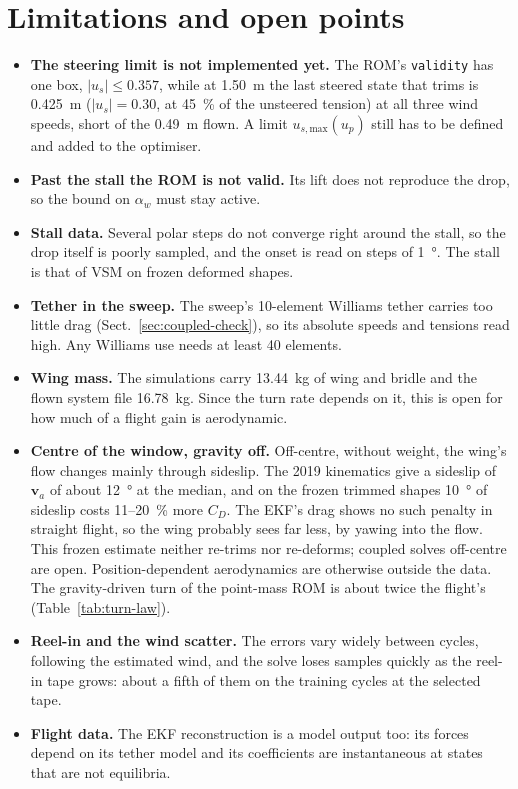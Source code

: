 \documentclass[11pt,a4paper]{article}
\newcommand{\code}[1]{\texttt{\small #1}}
\begin{document}
\section{Limitations and open points}
\label{sec:open}
\begin{itemize}
  \item \textbf{The steering limit is not implemented yet.} The ROM's \code{validity} has
        one box, $|u_s|\le0.357$, while at \SI{1.50}{\metre} the last steered state that trims
        is \SI{0.425}{\metre} ($|u_s|=0.30$, at \SI{45}{\percent} of the unsteered tension) at
        all three wind speeds, short of the \SI{0.49}{\metre} flown. A limit
        $u_{s,\mathrm{max}}(u_p)$ still has to be defined and added to the optimiser.
  \item \textbf{Past the stall the ROM is not valid.} Its lift does not reproduce the
        drop, so the bound on $\alpha_w$ must stay active.
  \item \textbf{Stall data.} Several polar steps do not converge right around the stall,
        so the drop itself is poorly sampled, and the onset is read on steps of
        \SI{1}{\degree}. The stall is that of VSM on frozen deformed shapes.
  \item \textbf{Tether in the sweep.} The sweep's 10-element Williams tether carries too little drag
        (Sect.~\ref{sec:coupled-check}), so its absolute speeds and tensions read high. Any
        Williams use needs at least 40 elements.
  \item \textbf{Wing mass.} The simulations carry \SI{13.44}{\kilogram} of wing and bridle
        and the flown system file \SI{16.78}{\kilogram}. Since the turn rate depends on it, this
        is open for how much of a flight gain is aerodynamic.
  \item \textbf{Centre of the window, gravity off.} Off-centre, without weight, the wing's flow
        changes mainly through sideslip. The 2019 kinematics give a sideslip of $\mathbf v_a$ of about
        \SI{12}{\degree} at the median, and on the frozen trimmed shapes \SI{10}{\degree} of sideslip costs
        11--\SI{20}{\percent} more $C_D$. The EKF's drag shows no such penalty in straight flight, so the
        wing probably sees far less, by yawing into the flow. This frozen estimate neither re-trims
        nor re-deforms; coupled solves off-centre are open. Position-dependent aerodynamics are
        otherwise outside the data. The gravity-driven turn of the point-mass ROM is about twice the
        flight's (Table~\ref{tab:turn-law}).
  \item \textbf{Reel-in and the wind scatter.} The errors vary widely between cycles, following
        the estimated wind, and the solve loses samples quickly as the reel-in tape grows:
        about a fifth of them on the training cycles at the selected tape.
  \item \textbf{Flight data.} The EKF reconstruction is a model output too: its forces
        depend on its tether model and its coefficients are instantaneous at states that
        are not equilibria.
\end{itemize}
\end{document}
